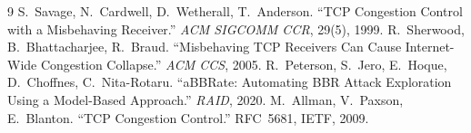 \documentclass[11pt,a4paper]{article}
\begin{document}
\begin{thebibliography}{9}
\small
{} S.~Savage, N.~Cardwell, D.~Wetherall, T.~Anderson.
``TCP Congestion Control with a Misbehaving Receiver.''
\textit{ACM SIGCOMM CCR}, 29(5), 1999.
 R.~Sherwood, B.~Bhattacharjee, R.~Braud.
``Misbehaving TCP Receivers Can Cause Internet-Wide Congestion Collapse.''
\textit{ACM CCS}, 2005.
 R.~Peterson, S.~Jero, E.~Hoque, D.~Choffnes, C.~Nita-Rotaru.
``aBBRate: Automating BBR Attack Exploration Using a Model-Based Approach.''
\textit{RAID}, 2020.
 M.~Allman, V.~Paxson, E.~Blanton. ``TCP Congestion Control.''
RFC~5681, IETF, 2009.
\end{thebibliography}
\end{document}
